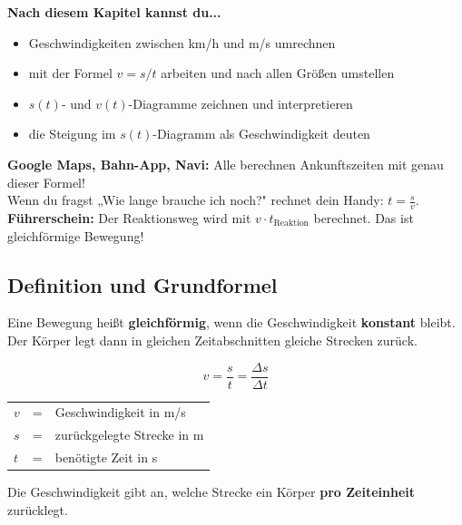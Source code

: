 \documentclass[11pt,a4paper]{article}
\begin{document}
\begin{tcolorbox}[colback=merkegreen!5, colframe=merkegreen, boxrule=0.5pt]
\textbf{Nach diesem Kapitel kannst du...}
\begin{itemize}[itemsep=1pt]
\item[$\checkmark$] Geschwindigkeiten zwischen km/h und m/s umrechnen
\item[$\checkmark$] mit der Formel $v = s/t$ arbeiten und nach allen Größen umstellen
\item[$\checkmark$] $s(t)$- und $v(t)$-Diagramme zeichnen und interpretieren
\item[$\checkmark$] die Steigung im $s(t)$-Diagramm als Geschwindigkeit deuten
\end{itemize}
\end{tcolorbox}

\begin{alltag}
\textbf{Google Maps, Bahn-App, Navi:} Alle berechnen Ankunftszeiten mit genau dieser Formel!\\[0.3em]
Wenn du fragst „Wie lange brauche ich noch?" rechnet dein Handy: $t = \frac{s}{v}$.\\[0.3em]
\textbf{Führerschein:} Der Reaktionsweg wird mit $v \cdot t_{\text{Reaktion}}$ berechnet. Das ist gleichförmige Bewegung!
\end{alltag}

\subsection{Definition und Grundformel}

Eine Bewegung heißt \textbf{gleichförmig}, wenn die Geschwindigkeit \textbf{konstant} bleibt. Der Körper legt dann in gleichen Zeitabschnitten gleiche Strecken zurück.

\begin{formelbox}
\[
\boxed{v = \frac{s}{t} = \frac{\Delta s}{\Delta t}}
\]
\begin{center}
\begin{tabular}{lcl}
$v$ & = & Geschwindigkeit in m/s \\
$s$ & = & zurückgelegte Strecke in m \\
$t$ & = & benötigte Zeit in s
\end{tabular}
\end{center}
\end{formelbox}

\begin{merksatz}
Die Geschwindigkeit gibt an, welche Strecke ein Körper \textbf{pro Zeiteinheit} zurücklegt.
\end{merksatz}
\end{document}
